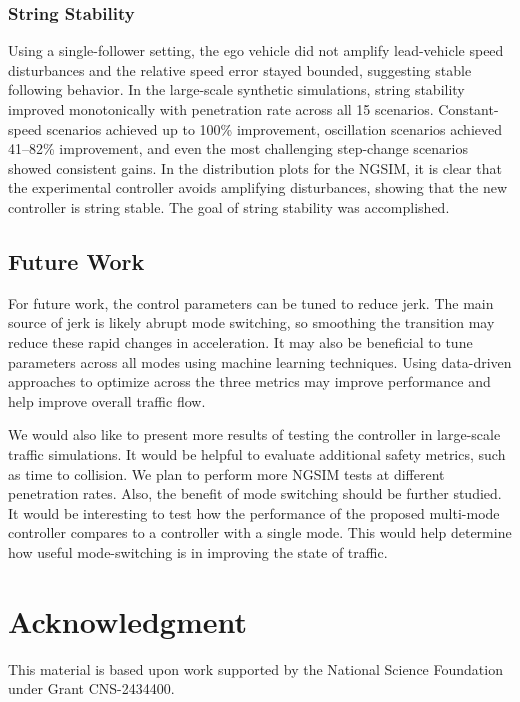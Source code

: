 \documentclass[conference]{IEEEtran}
\begin{document}




\subsubsection{String Stability}

Using a single-follower setting, the ego vehicle did not amplify lead-vehicle speed disturbances and the relative speed error stayed bounded, suggesting stable following behavior.  In the large-scale synthetic simulations, string stability improved monotonically with penetration rate across all 15 scenarios. Constant-speed scenarios achieved up to 100\% improvement, oscillation scenarios achieved 41--82\% improvement, and even the most challenging step-change scenarios showed consistent gains. In the distribution plots for the NGSIM, it is clear that the experimental controller avoids amplifying disturbances, showing that the new controller is string stable. The goal of string stability was accomplished.

\subsection{Future Work}

For future work, the control parameters can be tuned to reduce jerk. The main source of jerk is likely abrupt mode switching, so smoothing the transition may reduce these rapid changes in acceleration.
It may also be beneficial to tune parameters across all modes using machine learning techniques. Using data-driven approaches to optimize across the three metrics may improve performance and help improve overall traffic flow.

We would also like to present more results of testing the controller in large-scale traffic simulations. It would be helpful to evaluate additional safety metrics, such as time to collision. We plan to perform more NGSIM tests at different penetration rates. Also, the benefit of mode switching should be further studied. It would be interesting to test how the performance of the proposed multi-mode controller compares to a controller with a single mode. This would help determine how useful mode-switching is in improving the state of traffic.

\section*{Acknowledgment}
This material is based upon work supported by the National Science Foundation under Grant CNS-2434400. 



\end{document}
